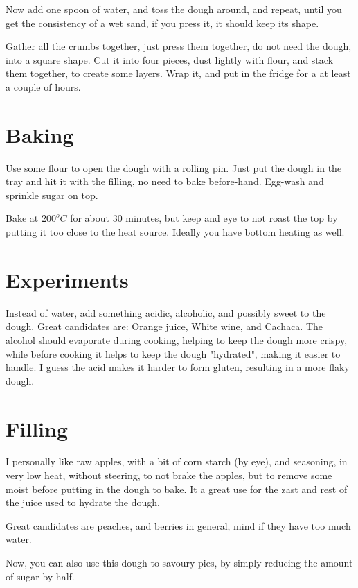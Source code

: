 Now add one spoon of water, and toss the dough around, and repeat, until you get the consistency of a wet sand, if you press it, it should keep its shape.

Gather all the crumbs together, just press them together, do not need the dough, into a square shape.
%
Cut it into four pieces, dust lightly with flour, and stack them together, to create some layers.
%
Wrap it, and put in the fridge for a at least a couple of hours.

\section{Baking}
Use some flour to open the dough with a rolling pin. 
%
Just put the dough in the tray and hit it with the filling, no need to bake before-hand. 
%
Egg-wash and sprinkle sugar on top.

Bake at $200^oC$ for about $30$ minutes, but keep and eye to not roast the top by putting it too close to the heat source. Ideally you have bottom heating as well.

\section{Experiments}
Instead of water, add something acidic, alcoholic, and possibly sweet to the dough. Great candidates are: Orange juice, White wine, and Cachaca.
%
The alcohol should evaporate during cooking, helping to keep the dough more crispy, while before cooking it helps to keep the dough "hydrated", making it easier to handle.
%
I guess the acid makes it harder to form gluten, resulting in a more flaky dough.

\section{Filling}

I personally like raw apples, with a bit of corn starch (by eye), and seasoning, in very low heat, without steering, to not brake the apples, but to remove some moist before putting in the dough to bake.
%
It a great use for the zast and rest of the juice used to hydrate the dough.

Great candidates are peaches, and berries in general, mind if they have too much water.

Now, you can also use this dough to savoury pies, by simply reducing the amount of sugar by half.